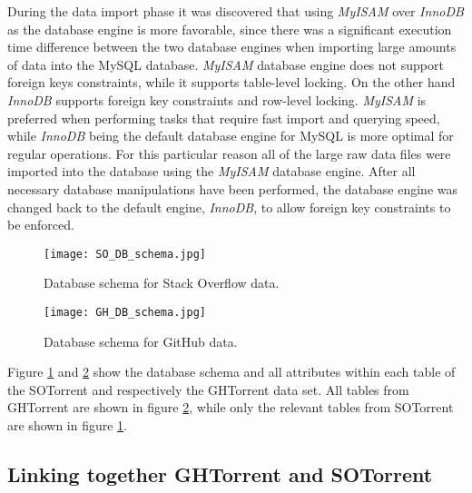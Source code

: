         During the data import phase it was discovered that using \textit{MyISAM} over \textit{InnoDB} as the database engine is more favorable, since there was a significant execution time difference between the two database engines when importing large amounts of data into the MySQL database. \textit{MyISAM} database engine does not support foreign keys constraints, while it supports table-level locking. On the other hand \textit{InnoDB} supports foreign key constraints and row-level locking. \textit{MyISAM} is preferred when performing tasks that require fast import and querying speed, while \textit{InnoDB} being the default database engine for MySQL is more optimal for regular operations. For this particular reason all of the large raw data files were imported into the database using the \textit{MyISAM} database engine. After all necessary database manipulations have been performed, the database engine was changed back to the default engine, \textit{InnoDB}, to allow foreign key constraints to be enforced. 
     
      
        \begin{figure}[!ht]
          \centering
          \texttt{[image: SO\_DB\_schema.jpg]}\\
          \caption{Database schema for Stack Overflow data.}
          \label{fig:so_schema}
        \end{figure}
        
 
        \begin{figure}[!ht]
          \centering
          \texttt{[image: GH\_DB\_schema.jpg]}\\
          \caption{Database schema for GitHub data.}
          \label{fig:gh_schema}
        \end{figure}
        
        
        Figure \ref{fig:so_schema} and \ref{fig:gh_schema} show the database schema and all attributes within each table of the SOTorrent and respectively the GHTorrent data set. All tables from GHTorrent are shown in figure \ref{fig:gh_schema}, while only the relevant tables from SOTorrent are shown in figure \ref{fig:so_schema}. 


    \subsection{Linking together GHTorrent and SOTorrent}\label{Linking_SO_GH}
    
